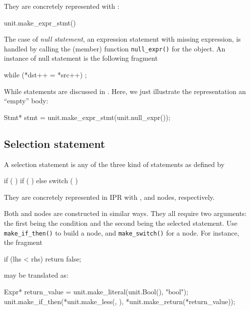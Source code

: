 \documentclass[a4paper,12pt]{article}
\begin{document}
They are concretely represented with :
\begin{Program}
           unit.make_expr_stmt()
\end{Program}
The case of \emph{null statement}, \ie{} an expression statement with
missing expression, is handled by calling the (member) function
\verb=null_expr()= for the  object.  An instance of null
statement is the following fragment
\begin{Program}
  while (*dst++ = *src++)
     ;
\end{Program}
While statements are discussed in .  Here, we
just illustrate the representation an ``empty'' body:
\begin{Program}
  Stmt* stmt = unit.make_expr_stmt(unit.null_expr());
\end{Program}

\subsection{Selection statement}
\label{sec:stmt.selection}

A selection statement is any of the three kind of statements as defined by 
\begin{Grammar}
      if (  ) 
      if (  )  else 
      switch (  ) 
\end{Grammar}
They are concretely represented in IPR with ,
 and  nodes,
respectively. 

Both  and  nodes are
constructed in similar ways. They all require two arguments: the first being
the condition and the second being the selected statement.  Use
\texttt{make\_if\_then()} to build a  node, and
\texttt{make\_switch()} for a   node.
 For instance, the fragment
\begin{Program}
  if (lhs < rhs)
     return false;
\end{Program}
may be translated as:
\begin{Program}
  Expr* return_value = unit.make_literal(unit.Bool(), "bool");
  unit.make_if_then(*unit.make_less(, ),
                    *unit.make_return(*return_value));
\end{Program}
\end{document}
